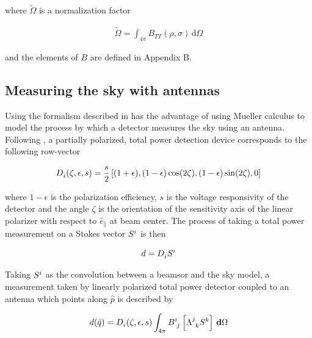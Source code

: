 \documentclass[a4paper,11pt]{article}
\newcommand{\co}{\mathbin{\|}}
\begin{document}
\noindent
where $\tilde{\Omega}$ is a normalization factor

\begin{equation}
\begin{aligned}
\tilde{\Omega} = \int_{4\pi} B_{TT}(\rho,\sigma) \, \mathrm{d} \Omega
\end{aligned}
\end{equation}

\noindent
and the elements of $B$ are defined in Appendix B. 

\subsection{Measuring the sky with antennas}

Using the formalism described in \cite{2007MNRAS.376.1767O} has the advantage of using Mueller calculus to model the process by which a detector measures the sky using an antenna. Following \cite{2007A&A...470..771J}, a partially polarized, total power detection device corresponds to the following row-vector 

\begin{equation}
\begin{aligned}
\tensor{D}{_{i}}(\zeta,\epsilon,s) = \frac{s}{2} \left[(1 + \epsilon), (1 - \epsilon)\cos(2\zeta), (1 - \epsilon)\sin(2\zeta), 0 \right]
\end{aligned}
\label{eq::M_pol}
\end{equation}

\noindent
where $1 - \epsilon$ is the polarization efficiency, $s$ is the voltage responsivity of the detector and the angle $\zeta$ is the orientation of the sensitivity axis of the linear polarizer with respect to $\hat{e}_{\co}$ at beam center. The process of taking a total power measurement on a Stokes vector $\tensor{S}{^{i}}$ is then

\begin{equation}
\begin{aligned}
d = \tensor{D}{_{i}} \tensor{S}{^{i}}
\end{aligned}
\label{eq::total_power_measurement}
\end{equation}

\noindent
Taking $\tensor{S}{^{i}}$ as the convolution between a beamsor and the sky model, a measurement taken by linearly polarized total power detector coupled to an antenna which points along $\hat{p}$ is described by

\begin{equation}
\begin{aligned}
d(\bar{q}) = \tensor{D}{_{i}}(\zeta,\epsilon,s) \int_{4\pi} \tensor{B}{^{i}_{j} } \left[ \tensor{\Lambda}{^{j}_{k} } \tensor{S}{^{k}} \right ] \, \mathbf{d} \Omega
\end{aligned}
\label{eq::total_power}
\end{equation}
\end{document}
